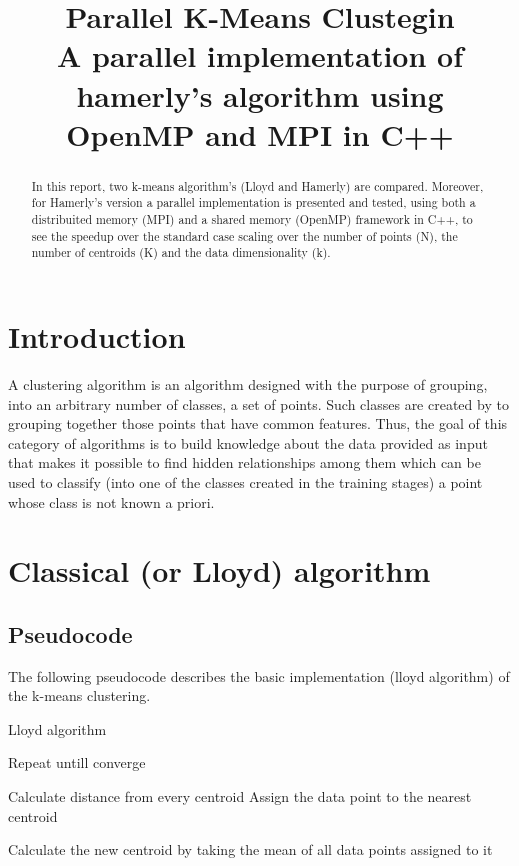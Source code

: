 \documentclass[conference]{IEEEtran}
\begin{document}
\title{Parallel K-Means Clustegin\\
{\footnotesize A parallel implementation of hamerly's algorithm using OpenMP and MPI in C++}
}

\author{
}

\maketitle

\begin{abstract}
In this report, two k-means algorithm's (Lloyd and Hamerly) are compared. Moreover, for Hamerly's version a parallel implementation is presented and tested, using both a distribuited memory (MPI) and a shared memory (OpenMP) framework in C++, to see the speedup over the standard case scaling over the number of points (N), the number of centroids (K) and the data dimensionality (k).
\end{abstract}

\section{Introduction}
A clustering algorithm is an algorithm designed with the purpose of grouping, into an arbitrary number of classes, a set of points. Such classes are created by to grouping together those points that have common features. Thus, the goal of this category of algorithms is to build knowledge about the data provided as input that makes it possible to find hidden relationships among them which can be used to classify (into one of the classes created in the training stages) a point whose class is not known a priori.

\section{Classical (or Lloyd) algorithm}

\subsection{Pseudocode}
The following pseudocode describes the basic implementation (lloyd algorithm) of the k-means clustering.

\begin{algorithm}[H]
  \caption{Lloyd algorithm}
  \begin{algorithmic}
    \State Repeat untill converge

      \State Calculate distance from every centroid
      \State Assign the data point to the nearest centroid
    \EndFor 

      \State Calculate the new centroid by taking the mean of all data points assigned to it
    \EndFor 
  \end{algorithmic}
\end{algorithm}
\end{document}

